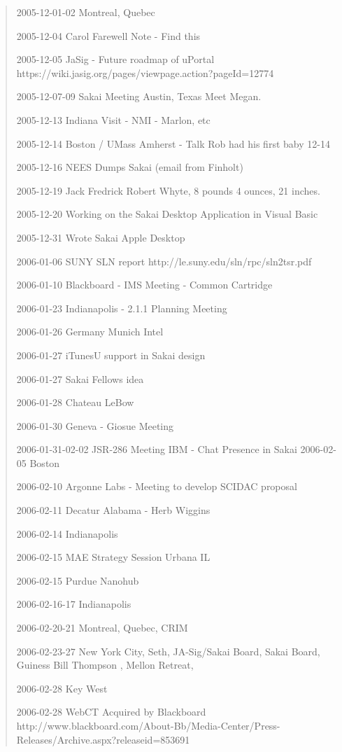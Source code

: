 \begin{quote}
2005-12-01-02 Montreal, Quebec

2005-12-04 Carol Farewell Note - Find this

2005-12-05 JaSig - Future roadmap of uPortal
https://wiki.jasig.org/pages/viewpage.action?pageId=12774

2005-12-07-09 Sakai Meeting Austin, Texas
Meet Megan.

2005-12-13 Indiana Visit - NMI - Marlon, etc

2005-12-14 Boston / UMass Amherst - Talk
Rob had his first baby 12-14

2005-12-16 NEES Dumps Sakai (email from Finholt)

2005-12-19 Jack Fredrick Robert Whyte, 8 pounds 4 ounces, 21 inches.

2005-12-20 Working on the Sakai Desktop Application in Visual Basic

2005-12-31 Wrote Sakai Apple Desktop

2006-01-06 SUNY SLN report
http://le.suny.edu/sln/rpc/sln2tsr.pdf

2006-01-10 Blackboard - IMS Meeting - Common Cartridge

2006-01-23 Indianapolis - 2.1.1 Planning Meeting

2006-01-26 Germany Munich Intel 

2006-01-27 iTunesU support in Sakai design

2006-01-27 Sakai Fellows idea

2006-01-28 Chateau LeBow

2006-01-30 Geneva - Giosue Meeting

2006-01-31-02-02 JSR-286 Meeting IBM - Chat Presence in  Sakai
2006-02-05 Boston 

2006-02-10 Argonne Labs - Meeting to develop SCIDAC proposal

2006-02-11 Decatur Alabama - Herb Wiggins 

2006-02-14 Indianapolis

2006-02-15 MAE Strategy Session Urbana IL

2006-02-15 Purdue Nanohub

2006-02-16-17 Indianapolis

2006-02-20-21 Montreal, Quebec, CRIM

2006-02-23-27 New York City, Seth, JA-Sig/Sakai Board, Sakai Board, Guiness Bill Thompson , Mellon Retreat, 

2006-02-28 Key West

2006-02-28 WebCT Acquired by Blackboard
http://www.blackboard.com/About-Bb/Media-Center/Press-Releases/Archive.aspx?releaseid=853691


\end{quote}
